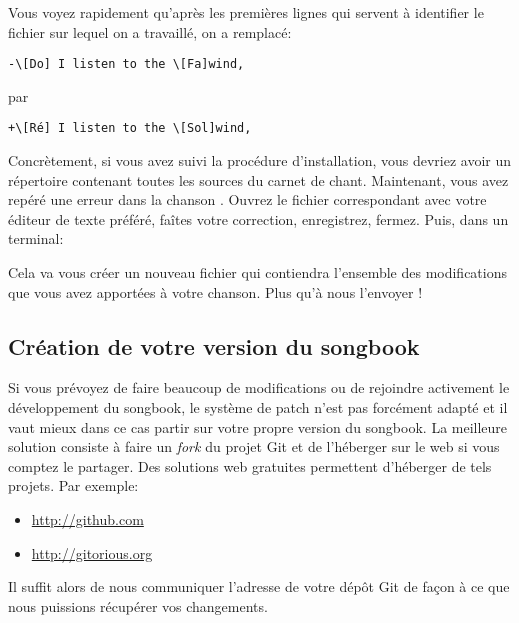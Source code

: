 \documentclass[versionenligne]{framabook}
\begin{document}
Vous voyez rapidement qu'après les premières lignes qui servent à
identifier le fichier sur lequel on a travaillé, on a remplacé:
\begin{verbatim}
-\[Do] I listen to the \[Fa]wind,
\end{verbatim}
par
\begin{verbatim}
+\[Ré] I listen to the \[Sol]wind,
\end{verbatim}

Concrètement, si vous avez suivi la procédure d'installation,
vous devriez avoir un répertoire  contenant toutes les
sources du carnet de chant. Maintenant, vous avez repéré une erreur
dans la chanson . Ouvrez le fichier
correspondant avec votre éditeur de texte préféré, faîtes votre
correction, enregistrez, fermez. Puis, dans un terminal:


Cela va vous créer un nouveau fichier  qui contiendra
l'ensemble des modifications que vous avez apportées à votre
chanson. Plus qu'à nous l'envoyer !

\subsection{Création de votre version du songbook}

Si vous prévoyez de faire beaucoup de modifications ou de rejoindre
activement le développement du songbook, le système de patch n'est pas
forcément adapté et il vaut mieux dans ce cas partir sur votre propre
version du songbook. La meilleure solution consiste à faire un
\emph{fork} du projet Git et de l'héberger sur le web si vous comptez
le partager. Des solutions web gratuites permettent d'héberger de tels
projets. Par exemple:
\begin{itemize}
\item \url{http://github.com}
\item \url{http://gitorious.org}
\end{itemize}

Il suffit alors de nous communiquer l'adresse de votre dépôt Git de
façon à ce que nous puissions récupérer vos changements.
\end{document}
